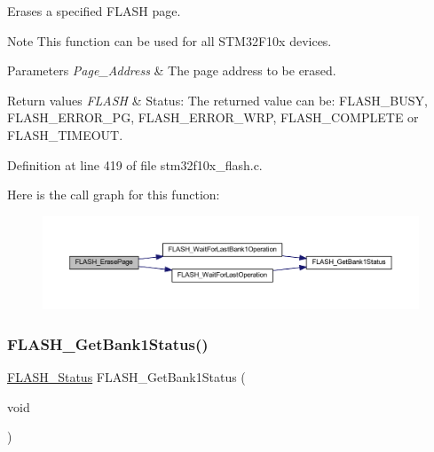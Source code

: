 Erases a specified F\+L\+A\+SH page. 

\begin{DoxyNote}{Note}
This function can be used for all S\+T\+M32\+F10x devices. 
\end{DoxyNote}

\begin{DoxyParams}{Parameters}
{\em Page\+\_\+\+Address} & The page address to be erased. \\
\hline
\end{DoxyParams}

\begin{DoxyRetVals}{Return values}
{\em F\+L\+A\+SH} & Status\+: The returned value can be\+: F\+L\+A\+S\+H\+\_\+\+B\+U\+SY, F\+L\+A\+S\+H\+\_\+\+E\+R\+R\+O\+R\+\_\+\+PG, F\+L\+A\+S\+H\+\_\+\+E\+R\+R\+O\+R\+\_\+\+W\+RP, F\+L\+A\+S\+H\+\_\+\+C\+O\+M\+P\+L\+E\+TE or F\+L\+A\+S\+H\+\_\+\+T\+I\+M\+E\+O\+UT. \\
\hline
\end{DoxyRetVals}


Definition at line 419 of file stm32f10x\+\_\+flash.\+c.

Here is the call graph for this function\+:
\nopagebreak
\begin{figure}[H]
\begin{center}
\leavevmode
\includegraphics[width=350pt]{group___f_l_a_s_h___private___functions_ga13a2ca18bfb3d5fb827a2751799f8451_cgraph}
\end{center}
\end{figure}
\mbox{\label{group___f_l_a_s_h___private___functions_ga9d5b76b75ef4c578cc45dc836a1929b6}} 
\subsubsection{\texorpdfstring{F\+L\+A\+S\+H\+\_\+\+Get\+Bank1\+Status()}{FLASH\_GetBank1Status()}}
{\footnotesize\ttfamily \hyperlink{group___f_l_a_s_h___exported___types_gadc63a6f3404ff1f71229a66915e9cdc0}{F\+L\+A\+S\+H\+\_\+\+Status} F\+L\+A\+S\+H\+\_\+\+Get\+Bank1\+Status (\begin{DoxyParamCaption}\item[{void}]{ }\end{DoxyParamCaption})}



